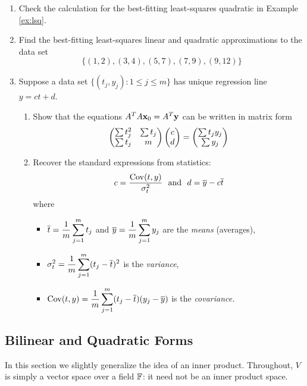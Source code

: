 \begin{tcolorbox}[exercisestyle,title={Extra Problems\quad }]
	\begin{enumerate}[resume]
		\item Check the calculation for the best-fitting least-squares quadratic in Example \ref{ex:lsq}.
	  
	  
	  \item Find the best-fitting least-squares linear and quadratic approximations to the data set
	  \[
	  	\big\{(1,2),(3,4),(5,7),(7,9),(9,12)\big\}
	  \]
	  
	  
	  \item Suppose a data set $\big\{(t_j,y_j):1\le j\le m\big\}$ has unique regression line $y=ct+d$.
	  \begin{enumerate}
	    \item Show that the equations $A^TA{\mathbf{x}}_0=A^T{\mathbf{y}}$ can be written in matrix form
	    \[
	    	\begin{pmatrix}
	    		\sum t^2_j&\sum t_j\\
	    		\sum t_j&m
	    	\end{pmatrix}
	    	\begin{pmatrix}c\\d\end{pmatrix} =\begin{pmatrix}\sum t_jy_j\\\sum y_j\end{pmatrix}
	    \]
	    \item Recover the standard expressions from statistics:
	    \[
	    	c=\frac{\Cov(t,y)}{\sigma^2_t}\ \text{ and }\ d=\cl y-c\cl t
	    \]
	    where
	    \begin{itemize}
	      \item $\displaystyle\overline{t}=\frac 1m\sum_{j=1}^m t_j$ and $\displaystyle\overline{y}=\frac 1m\sum_{j=1}^m y_j$ are the \emph{means} (averages),
	      \item $\displaystyle\sigma^2_t=\frac 1m\sum_{j=1}^m(t_j-\overline{t})^2$ is the \emph{variance},
	      \item $\displaystyle\operatorname{Cov}(t,y)=\frac 1m\sum_{j=1}^m(t_j-\overline{t})(y_j-\overline{y})$ is the \emph{covariance.}
	    \end{itemize}
		\end{enumerate}
	\end{enumerate}
\end{tcolorbox}



\clearpage


\subsection{Bilinear and Quadratic Forms}

In this section we slightly generalize the idea of an inner product. Throughout, $V$ is simply a vector space over a field $\mathbb{F}$: it need not be an inner product space.

